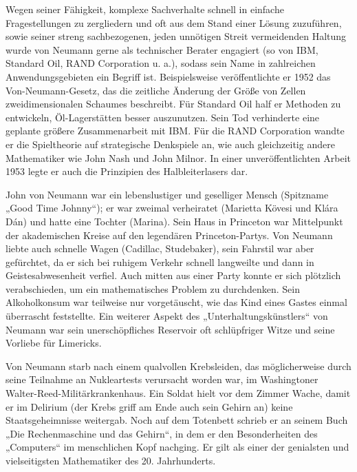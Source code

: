 Wegen seiner Fähigkeit, komplexe Sachverhalte schnell in einfache Fragestellungen zu zergliedern und oft aus dem Stand einer Lösung zuzuführen, sowie seiner streng sachbezogenen, jeden unnötigen Streit vermeidenden Haltung wurde von Neumann gerne als technischer Berater engagiert (so von IBM, Standard Oil, RAND Corporation u. a.), sodass sein Name in zahlreichen Anwendungsgebieten ein Begriff ist. Beispielsweise veröffentlichte er 1952 das Von-Neumann-Gesetz, das die zeitliche Änderung der Größe von Zellen zweidimensionalen Schaumes beschreibt. Für Standard Oil half er Methoden zu entwickeln, Öl-Lagerstätten besser auszunutzen. Sein Tod verhinderte eine geplante größere Zusammenarbeit mit IBM. Für die RAND Corporation wandte er die Spieltheorie auf strategische Denkspiele an, wie auch gleichzeitig andere Mathematiker wie John Nash und John Milnor. In einer unveröffentlichten Arbeit 1953 legte er auch die Prinzipien des Halbleiterlasers dar.

John von Neumann war ein lebenslustiger und geselliger Mensch (Spitzname „Good Time Johnny“); er war zweimal verheiratet (Marietta Kövesi und Klára Dán) und hatte eine Tochter (Marina). Sein Haus in Princeton war Mittelpunkt der akademischen Kreise auf den legendären Princeton-Partys. Von Neumann liebte auch schnelle Wagen (Cadillac, Studebaker), sein Fahrstil war aber gefürchtet, da er sich bei ruhigem Verkehr schnell langweilte und dann in Geistesabwesenheit verfiel. Auch mitten aus einer Party konnte er sich plötzlich verabschieden, um ein mathematisches Problem zu durchdenken. Sein Alkoholkonsum war teilweise nur vorgetäuscht, wie das Kind eines Gastes einmal überrascht feststellte. Ein weiterer Aspekt des „Unterhaltungskünstlers“ von Neumann war sein unerschöpfliches Reservoir oft schlüpfriger Witze und seine Vorliebe für Limericks.

Von Neumann starb nach einem qualvollen Krebsleiden, das möglicherweise durch seine Teilnahme an Nukleartests verursacht worden war, im Washingtoner Walter-Reed-Militärkrankenhaus. Ein Soldat hielt vor dem Zimmer Wache, damit er im Delirium (der Krebs griff am Ende auch sein Gehirn an) keine Staatsgeheimnisse weitergab. Noch auf dem Totenbett schrieb er an seinem Buch „Die Rechenmaschine und das Gehirn“, in dem er den Besonderheiten des „Computers“ im menschlichen Kopf nachging. Er gilt als einer der genialsten und vielseitigsten Mathematiker des 20. Jahrhunderts.